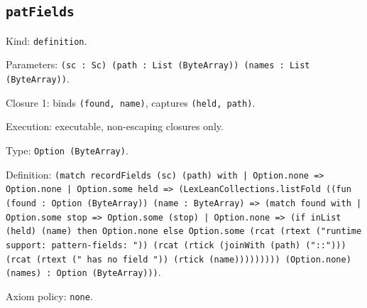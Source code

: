 \documentclass[11pt]{article}
\begin{document}
\subsection*{\texttt{patFields}}
\noindent Kind: \texttt{definition}.\par
\noindent Parameters: \texttt{(sc : Sc) (path : List (ByteArray)) (names : List (ByteArray))}.\par
\noindent Closure 1: binds \texttt{(found, name)}, captures \texttt{(held, path)}.\par
\noindent Execution: executable, non-escaping closures only.\par
\noindent Type: \texttt{Option (ByteArray)}.\par
\noindent Definition: \texttt{(match recordFields (sc) (path) with | Option.none => Option.none | Option.some held => (LexLeanCollections.listFold ((fun (found : Option (ByteArray)) (name : ByteArray) => (match found with | Option.some stop => Option.some (stop) | Option.none => (if inList (held) (name) then Option.none else Option.some (rcat (rtext ("runtime support: pattern-fields: ")) (rcat (rtick (joinWith (path) ("::"))) (rcat (rtext (" has no field ")) (rtick (name))))))))) (Option.none) (names) : Option (ByteArray)))}.\par
\noindent Axiom policy: \texttt{none}.\par
\end{document}

